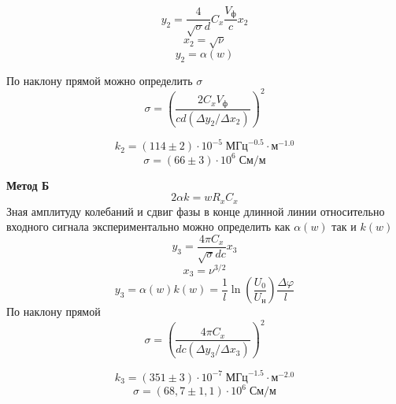 \[
    y_{2} = \frac{4}{\sqrt{\sigma}d}C_{x}\frac{V_{\text{ф}}}{c}x_{2}
\]
\[
    x_{2} = \sqrt{\nu}
\]
\[
    y_{2} = \alpha(w)
\]

По наклону прямой можно определить $\sigma$
\[
    \sigma = \left(\frac{2C_{x}V_{\text{ф}}}{cd\left(\Delta y_{2}/ \Delta x_{2}\right)}\right)^{2}
\]

\begin{figure}[ht!]
\end{figure}
\[
    k_{2} = \left(114 \pm 2\right)\cdot 10^{-5}\;\text{МГц}^{-0.5}\cdot\text{м}^{-1.0}
\]
\[
    \sigma = \left(66 \pm 3\right)\cdot 10^{6}\;\text{См} / \text{м}
\]


\textbf{Метод Б}
\[
    2 \alpha k = wR_{x}C_{x}
\]
Зная амплитуду колебаний и сдвиг фазы в конце длинной линии относительно входного
сигнала экспериментально можно определить как $ \alpha(w)$ так и $k(w)$
\[
    y_{3} = \frac{4 \pi C_{x}}{\sqrt{\sigma}dc}x_{3}
\]
\[
    x_{3} = \nu^{3/2}
\]
\[
    y_{3} = \alpha(w)k(w) = \frac{1}{l}\ln\left(\frac{U_{0}}{U_{\text{н}}}\right)\frac{ \Delta \varphi}{l}
\]
По наклону прямой
\[
    \sigma = \left(\frac{4 \pi C_{x}}{dc\left(\Delta y_{3}/ \Delta x_{3}\right)}\right)^{2}
\]

\begin{figure}[ht!]
\end{figure}
\[
    k_{3} = \left(351 \pm 3\right)\cdot 10^{-7}\;\text{МГц}^{-1.5}\cdot\text{м}^{-2.0}
\]
\[
    \sigma = \left(68{,}7 \pm 1{,}1\right)\cdot 10^{6}\;\text{См} / \text{м}
\]


